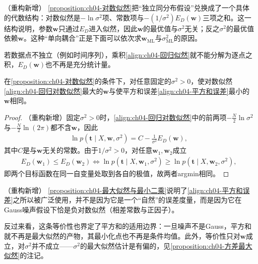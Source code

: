 \documentclass[../../main.tex]{subfiles}
\begin{document}
\begin{remark}（重构新增）
\cref{proposition:ch04-对数似然}把“独立同分布假设”兑换成了一个具体的代数结构：对数似然是$-\ln\sigma^2$项、常数项与$-(1/\sigma^2)E_D(\boldsymbol{w})$三项之和。这一结构说明，参数$\boldsymbol{w}$只通过$E_D$进入似然，因此$\boldsymbol{w}$的最优值与$\sigma^2$无关；反之$\sigma^2$的最优值依赖$\boldsymbol{w}$。这种“单向耦合”正是下面可以依次求$\boldsymbol{w}_{\mathrm{ML}}$与$\sigma^2_{\mathrm{ML}}$的原因。

若数据点不独立（例如时间序列），乘积\eqref{align:ch04-回归似然}就不能分解为逐点之积，$E_D(\boldsymbol{w})$也不再是充分统计量。
\end{remark}

\begin{proposition}[最大似然等价于最小二乘]\label{proposition:ch04-最大似然与最小二乘}
在\cref{proposition:ch04-对数似然}的条件下，对任意固定的$\sigma^2>0$，使对数似然\eqref{align:ch04-回归对数似然}最大的$\boldsymbol{w}$与使平方和误差\eqref{align:ch04-平方和误差}最小的$\boldsymbol{w}$相同。
\end{proposition}

\begin{proof}
（重构新增）固定$\sigma^2>0$时，\eqref{align:ch04-回归对数似然}中的前两项$-\frac{N}{2}\ln\sigma^2$与$-\frac{N}{2}\ln(2\pi)$都不含$\boldsymbol{w}$，因此
\begin{align*}
  \ln p(\boldsymbol{t}\mid X,\boldsymbol{w},\sigma^2)=C-\frac{1}{\sigma^2}E_D(\boldsymbol{w}),
\end{align*}
其中$C$是与$\boldsymbol{w}$无关的常数。由于$1/\sigma^2>0$，对任意$\boldsymbol{w}_1,\boldsymbol{w}_2$成立
\begin{align*}
  E_D(\boldsymbol{w}_1)\leqslant E_D(\boldsymbol{w}_2)\iff\ln p(\boldsymbol{t}\mid X,\boldsymbol{w}_1,\sigma^2)\geqslant\ln p(\boldsymbol{t}\mid X,\boldsymbol{w}_2,\sigma^2),
\end{align*}
即两个目标函数在同一自变量处取到各自的极值，故两者argmin相同。
\end{proof}

\begin{remark}（重构新增）
\cref{proposition:ch04-最大似然与最小二乘}说明了\eqref{align:ch04-平方和误差}之所以被广泛使用，并不是因为它是一个“自然”的误差度量，而是因为它在Gauss噪声假设下恰是负对数似然（相差常数与正因子）。

反过来看，这条等价性也界定了平方和的适用边界：一旦噪声不是Gauss，平方和就不再是最大似然的产物，其最小化点也不再是条件均值。此外，等价性只对$\boldsymbol{w}$成立，对$\sigma^2$并不成立——$\sigma^2$的最大似然估计是有偏的，见\cref{proposition:ch04-方差最大似然}的注记。
\end{remark}
\end{document}
